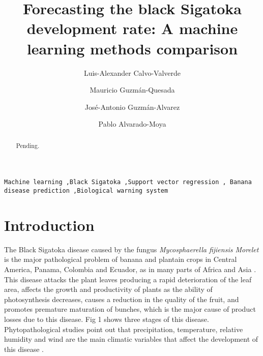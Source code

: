 \documentclass[review]{elsarticle}
\begin{document}
\begin{frontmatter}

\title{Forecasting the black Sigatoka development rate: A machine learning methods comparison 
}

\author[afiLuisAlex]{Luis-Alexander Calvo-Valverde}

\author[afiCorbana] {Mauricio Guzm\'an-Quesada}

\author[afiCorbana]{Jos\'e-Antonio Guzm\'an-Alvarez}

\author[afiPablo]{Pablo Alvarado-Moya}

\address[afiLuisAlex]{DOCINADE, Instituto Tecnol\'ogico de Costa Rica, 
Computer Research Center, Multidisciplinar program eScience, 
CNCA/CeNAT, Cartago, Costa Rica}

\address[afiCorbana]{Direcci\'on de Investigaciones, Corporaci\'on Bananera Nacional S.A., Gu\'apiles, Costa Rica}

\address[afiPablo]{DOCINADE, Instituto Tecnol\'ogico de Costa Rica, Cartago, Costa Rica}


\begin{abstract}
Pending.
\end{abstract}

\begin{keyword}
\texttt{Machine learning \sep Black Sigatoka \sep Support vector regression \sep
Banana disease prediction \sep Biological warning system }
\end{keyword}

\end{frontmatter}

\linenumbers

\section{Introduction}
The Black Sigatoka disease caused by the fungus {\it Mycosphaerella fijiensis Morelet} is the major pathological problem of banana and plantain crops in Central America, Panama, Colombia and Ecuador, as in many parts of Africa and Asia \citep{MarinVargas1995}.\\
This disease attacks the plant leaves producing a rapid deterioration of the leaf area, affects the growth and productivity of plants as the ability of photosynthesis decreases, causes a reduction in the quality of the fruit, and promotes premature maturation of bunches, which is the major cause of product losses due to this disease. Fig 1 shows three stages of this disease. \\
Phytopathological studies point out that precipitation, temperature, relative humidity and wind are the main climatic variables that affect the development of this disease \citep{MarinVargas1995}.\\
 	 	 
\end{document}
